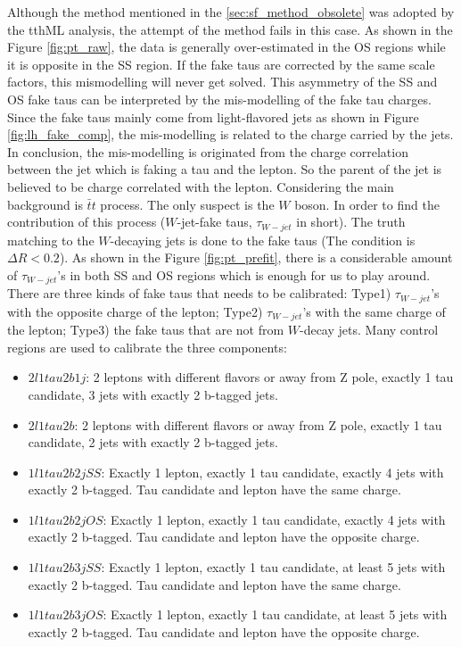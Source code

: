 Although the method mentioned in the \ref{sec:sf_method_obsolete} was adopted by the tthML analysis, the attempt of the method fails in this case. As shown in the Figure \ref{fig:pt_raw}, the data is generally over-estimated in the OS regions while it is opposite in the SS region. If the fake taus are corrected by the same scale factors, this mismodelling will never get solved. This asymmetry of the SS and OS fake taus can be interpreted by the mis-modelling of the fake tau charges. Since the fake taus mainly come from light-flavored jets as shown in Figure \ref{fig:lh_fake_comp}, the mis-modelling is related to the charge carried by the jets. In conclusion, the mis-modelling is originated from the charge correlation between the jet which is faking a tau and the lepton. So the parent of the jet is believed to be charge correlated with the lepton. Considering the main background is $\bar{t}t$ process. The only suspect is the $W$ boson. In order to find the contribution of this process ($W$-jet-fake taus, $\tau_{W-jet}$ in short). The truth matching to the $W$-decaying jets is done to the fake taus (The condition is $\Delta R < 0.2$). As shown in the Figure \ref{fig:pt_prefit}, there is a considerable amount of $\tau_{W-jet}$'s in both SS and OS regions which is enough for us to play around. There are three kinds of fake taus that needs to be calibrated: Type1) $\tau_{W-jet}$'s with the opposite charge of the lepton; Type2) $\tau_{W-jet}$'s with the same charge of the lepton; Type3) the fake taus that are not from $W$-decay jets. Many control regions are used to calibrate the three components:

\begin{itemize}
\item{$2l1tau2b1j$: 2 leptons with different flavors or away from Z pole, exactly 1 tau candidate, 3 jets with exactly 2 b-tagged jets.}
\item{$2l1tau2b$: 2 leptons with different flavors or away from Z pole, exactly 1 tau candidate, 2 jets with exactly 2 b-tagged jets.}
\item{$1l1tau2b2j SS$: Exactly 1 lepton, exactly 1 tau candidate, exactly 4 jets with exactly 2 b-tagged. Tau candidate and lepton have the same charge.}
\item{$1l1tau2b2j OS$: Exactly 1 lepton, exactly 1 tau candidate, exactly 4 jets with exactly 2 b-tagged. Tau candidate and lepton have the opposite charge.}
\item{$1l1tau2b3j SS$: Exactly 1 lepton, exactly 1 tau candidate, at least 5 jets with exactly 2 b-tagged. Tau candidate and lepton have the same charge.}
\item{$1l1tau2b3j OS$: Exactly 1 lepton, exactly 1 tau candidate, at least 5 jets with exactly 2 b-tagged. Tau candidate and lepton have the opposite charge.}
\end{itemize}

